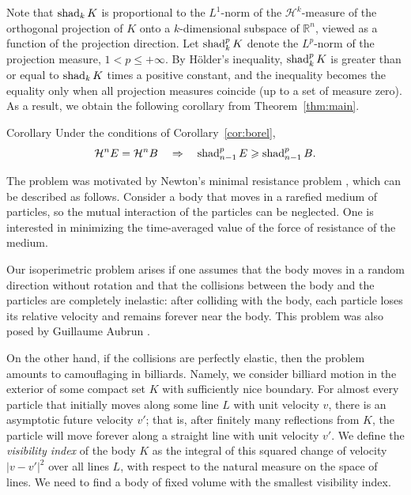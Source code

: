 \documentclass[a4paper,10pt]{article}
\begin{document}
\medskip

Note that $\mathop{\rm shad}\nolimits_k K$ is proportional to the $L^1$-norm of the $\mathcal H^k$-measure of the orthogonal projection of $K$ onto a $k$-dimensional subspace of $\mathbb{R}^n$, viewed as a function of the projection direction.
Let $\mathop{\rm shad}\nolimits_k^p K$ denote the $L^p$-norm of the projection measure, $1 < p \le +\infty$.
By Hölder’s inequality, $\mathop{\rm shad}\nolimits_k^p K$ is greater than or equal to $\mathop{\rm shad}\nolimits_k K$ times a positive constant, and the inequality becomes the equality only when all projection measures coincide (up to a set of measure zero).
As a result, we obtain the following corollary from Theorem~\ref{thm:main}.

\begin{thm}{Corollary}\label{cor:Lp}
Under the conditions of Corollary~\ref{cor:borel},
\[
\mathcal H^n E= \mathcal H^n B
\quad\Rightarrow\quad
\mathop{\rm shad}\nolimits_{n-1}^p E\geqslant \mathop{\rm shad}\nolimits_{n-1}^p B.
\]

\end{thm}

The problem was motivated by Newton's minimal resistance problem \cite{N}, which can be described as follows.
Consider a body that moves in a rarefied medium of particles, so the mutual interaction of the particles can be neglected.
One is interested in minimizing the time-averaged value of the force of resistance of the medium.

Our isoperimetric problem arises if one assumes that the body moves in a random direction without rotation and that the collisions between the body and the particles are completely inelastic: after colliding with the body, each particle loses its relative velocity and remains forever near the body.
This problem was also posed by Guillaume Aubrun \cite{guillaume}.

On the other hand, if the collisions are perfectly elastic, then the problem amounts to camouflaging in billiards.
Namely, we consider billiard motion in the exterior of some compact set $K$ with sufficiently nice boundary.
For almost every particle that initially
moves along some line $L$ with unit velocity $v$, there is an
asymptotic future velocity $v'$; that is, after finitely many
reflections from $K$, the particle will move forever along a straight
line with unit velocity $v'$.
We define the \emph{visibility index} of the body $K$ as the integral
of this squared change of velocity $|v-v'|^2$ over all lines $L$, with respect to
the natural measure on the space of lines.
We need to find a body of fixed volume with the smallest visibility index.
\end{document}
